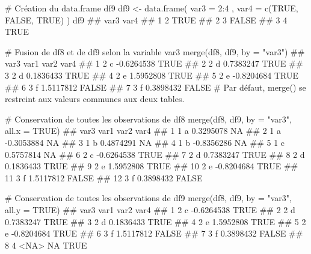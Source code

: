 \documentclass[12pt,twosided, notitlepage]{book}
\newenvironment{Shaded}{}{}
\newcommand{\KeywordTok}[1]{\textcolor[rgb]{0.00,0.00,1.00}{{#1}}}
\newcommand{\DataTypeTok}[1]{{#1}}
\newcommand{\DecValTok}[1]{{#1}}
\newcommand{\StringTok}[1]{\textcolor[rgb]{0.00,0.50,0.50}{{#1}}}
\newcommand{\CommentTok}[1]{\textcolor[rgb]{0.00,0.50,0.00}{{#1}}}
\newcommand{\OtherTok}[1]{\textcolor[rgb]{1.00,0.25,0.00}{{#1}}}
\newcommand{\NormalTok}[1]{{#1}}
\renewenvironment{Shaded}{\begin{snugshade}}{\end{snugshade}}
\begin{document}
\begin{Shaded}
\begin{Highlighting}[]
\CommentTok{# Création du data.frame df9}
\NormalTok{df9 <-}\StringTok{ }\KeywordTok{data.frame}\NormalTok{(}
  \DataTypeTok{var3 =} \DecValTok{2}\NormalTok{:}\DecValTok{4}
  \NormalTok{, }\DataTypeTok{var4 =} \KeywordTok{c}\NormalTok{(}\OtherTok{TRUE}\NormalTok{, }\OtherTok{FALSE}\NormalTok{, }\OtherTok{TRUE}\NormalTok{)}
\NormalTok{)}
\NormalTok{df9}
  \NormalTok{##   var3  var4}
  \NormalTok{## 1    2  TRUE}
  \NormalTok{## 2    3 FALSE}
  \NormalTok{## 3    4  TRUE}

\CommentTok{# Fusion de df8 et de df9 selon la variable var3}
\KeywordTok{merge}\NormalTok{(df8, df9, }\DataTypeTok{by =} \StringTok{"var3"}\NormalTok{)}
  \NormalTok{##   var3 var1       var2  var4}
  \NormalTok{## 1    2    c -0.6264538  TRUE}
  \NormalTok{## 2    2    d  0.7383247  TRUE}
  \NormalTok{## 3    2    d  0.1836433  TRUE}
  \NormalTok{## 4    2    e  1.5952808  TRUE}
  \NormalTok{## 5    2    e -0.8204684  TRUE}
  \NormalTok{## 6    3    f  1.5117812 FALSE}
  \NormalTok{## 7    3    f  0.3898432 FALSE}
\CommentTok{# Par défaut, merge() se restreint aux valeurs communes aux deux tables.}

\CommentTok{# Conservation de toutes les observations de df8}
\KeywordTok{merge}\NormalTok{(df8, df9, }\DataTypeTok{by =} \StringTok{"var3"}\NormalTok{, }\DataTypeTok{all.x =} \OtherTok{TRUE}\NormalTok{)}
  \NormalTok{##    var3 var1       var2  var4}
  \NormalTok{## 1     1    a  0.3295078    NA}
  \NormalTok{## 2     1    a -0.3053884    NA}
  \NormalTok{## 3     1    b  0.4874291    NA}
  \NormalTok{## 4     1    b -0.8356286    NA}
  \NormalTok{## 5     1    c  0.5757814    NA}
  \NormalTok{## 6     2    c -0.6264538  TRUE}
  \NormalTok{## 7     2    d  0.7383247  TRUE}
  \NormalTok{## 8     2    d  0.1836433  TRUE}
  \NormalTok{## 9     2    e  1.5952808  TRUE}
  \NormalTok{## 10    2    e -0.8204684  TRUE}
  \NormalTok{## 11    3    f  1.5117812 FALSE}
  \NormalTok{## 12    3    f  0.3898432 FALSE}

\CommentTok{# Conservation de toutes les observations de df9}
\KeywordTok{merge}\NormalTok{(df8, df9, }\DataTypeTok{by =} \StringTok{"var3"}\NormalTok{, }\DataTypeTok{all.y =} \OtherTok{TRUE}\NormalTok{)}
  \NormalTok{##   var3 var1       var2  var4}
  \NormalTok{## 1    2    c -0.6264538  TRUE}
  \NormalTok{## 2    2    d  0.7383247  TRUE}
  \NormalTok{## 3    2    d  0.1836433  TRUE}
  \NormalTok{## 4    2    e  1.5952808  TRUE}
  \NormalTok{## 5    2    e -0.8204684  TRUE}
  \NormalTok{## 6    3    f  1.5117812 FALSE}
  \NormalTok{## 7    3    f  0.3898432 FALSE}
  \NormalTok{## 8    4 <NA>         NA  TRUE}
\end{Highlighting}
\end{Shaded}
\end{document}
